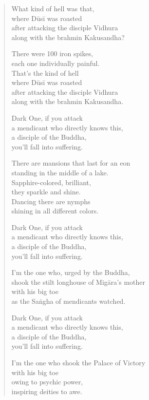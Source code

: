 \documentclass[12pt,openany]{book}%
\begin{document}
\begin{verse}%
What kind of hell was that, \\
where \textsanskrit{Dūsī} was roasted \\
after attacking the disciple Vidhura \\
along with the brahmin Kakusandha? 

There were 100 iron spikes, \\
each one individually painful. \\
That’s the kind of hell \\
where \textsanskrit{Dūsī} was roasted \\
after attacking the disciple Vidhura \\
along with the brahmin Kakusandha. 

Dark One, if you attack \\
a mendicant who directly knows this, \\
a disciple of the Buddha, \\
you’ll fall into suffering. 

There are mansions that last for an eon \\
standing in the middle of a lake. \\
Sapphire-colored, brilliant, \\
they sparkle and shine. \\
Dancing there are nymphs \\
shining in all different colors. 

Dark One, if you attack \\
a mendicant who directly knows this, \\
a disciple of the Buddha, \\
you’ll fall into suffering. 

I’m the one who, urged by the Buddha, \\
shook the stilt longhouse of \textsanskrit{Migāra}’s mother \\
with his big toe \\
as the \textsanskrit{Saṅgha} of mendicants watched. 

Dark One, if you attack \\
a mendicant who directly knows this, \\
a disciple of the Buddha, \\
you’ll fall into suffering. 

I’m the one who shook the Palace of Victory \\
with his big toe \\
owing to psychic power, \\
inspiring deities to awe. 


\end{verse}
\end{document}
